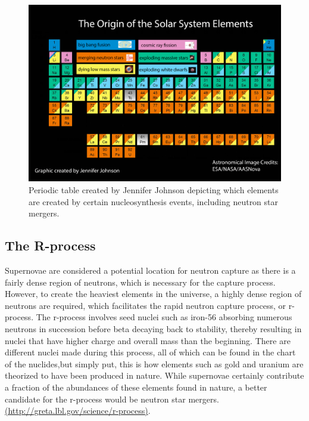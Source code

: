 \documentclass[11pt,a4paper]{article}
\begin{document}
\begin{figure}[h!]
  \includegraphics[width=1\textwidth]{periodic_table.png}
  \caption{Periodic table created by Jennifer Johnson depicting which elements are created by certain nucleosynthesis events, including neutron star mergers.}
\end{figure}

\subsection{The R-process}

Supernovae are considered a potential location for neutron capture as there is a fairly dense region of neutrons, which is necessary for the capture process. However, to create the heaviest elements in the universe, a highly dense region of neutrons are required, which facilitates the rapid neutron capture process, or r-process. The r-process involves seed nuclei such as iron-56 absorbing numerous neutrons in succession before beta decaying back to stability, thereby resulting in nuclei that have higher charge and overall mass than the beginning. There are different nuclei made during this process, all of which can be found in the chart of the nuclides,but simply put, this is how elements such as gold and uranium are theorized to have been produced in nature. While supernovae certainly contribute a fraction of the abundances of these elements found in nature, a better candidate for the r-process would be neutron star mergers. \url{(http://greta.lbl.gov/science/r-process)}. 
\end{document}
